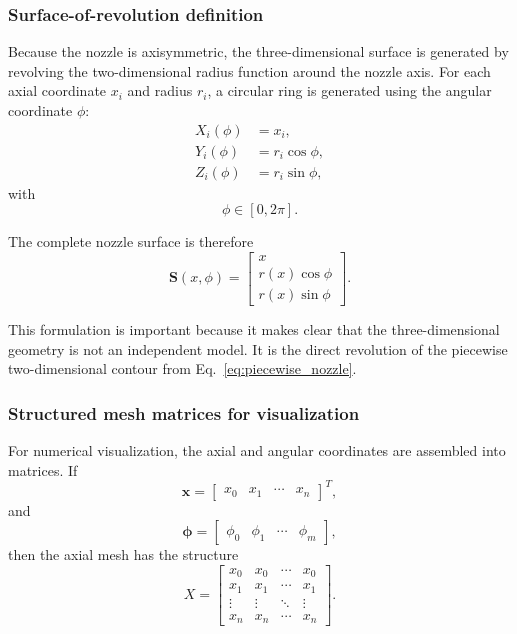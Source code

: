 \subsubsection{Surface-of-revolution definition}

Because the nozzle is axisymmetric, the three-dimensional surface is generated by revolving the two-dimensional radius function around the nozzle axis. For each axial coordinate $x_i$ and radius $r_i$, a circular ring is generated using the angular coordinate $\phi$:
\begin{align}
X_i(\phi)&=x_i,\\
Y_i(\phi)&=r_i\cos\phi,\\
Z_i(\phi)&=r_i\sin\phi,
\end{align}
with
\begin{equation}
\phi\in[0,2\pi].
\end{equation}

The complete nozzle surface is therefore
\begin{equation}
\bm{S}(x,\phi)=
\begin{bmatrix}
x\\
r(x)\cos\phi\\
r(x)\sin\phi
\end{bmatrix}.
\label{eq:surface_of_revolution}
\end{equation}

This formulation is important because it makes clear that the three-dimensional geometry is not an independent model. It is the direct revolution of the piecewise two-dimensional contour from Eq.~\eqref{eq:piecewise_nozzle}.



\subsubsection{Structured mesh matrices for visualization}

For numerical visualization, the axial and angular coordinates are assembled into matrices. If
\begin{equation}
\bm{x}=\begin{bmatrix}x_0&x_1&\cdots&x_n\end{bmatrix}^T,
\end{equation}
and
\begin{equation}
\bm{\phi}=\begin{bmatrix}\phi_0&\phi_1&\cdots&\phi_m\end{bmatrix},
\end{equation}
then the axial mesh has the structure
\begin{equation}
X=\begin{bmatrix}
x_0&x_0&\cdots&x_0\\
x_1&x_1&\cdots&x_1\\
\vdots&\vdots&\ddots&\vdots\\
x_n&x_n&\cdots&x_n
\end{bmatrix}.
\label{eq:Xmesh}
\end{equation}

